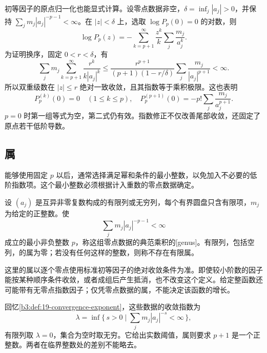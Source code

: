 \ProseParagraphBreak

初等因子的原点归一化也能显式计算。设零点数据非空，\(\delta=\inf_j|a_j|>0\)，并保持 \(\sum_jm_j|a_j|^{-p-1}<\infty\)。在 \(|z|<\delta\) 上，选取 \(\log P_p(0)=0\) 的对数，则
\begin{equation}\label{b3:eq:20-canonical-log-expansion}
 \log P_p(z)
 =-\sum_{k=p+1}^{\infty}\frac{z^k}{k}
       \sum_j\frac{m_j}{a_j^k}.
\end{equation}
为证明换序，固定 \(0<r<\delta\)，有
\[
 \sum_jm_j\sum_{k=p+1}^{\infty}\frac{r^k}{k|a_j|^k}
 \le\frac{r^{p+1}}{(p+1)(1-r/\delta)}
       \sum_j\frac{m_j}{|a_j|^{p+1}}<\infty.
\]
所以双重级数在 \(|z|\le r\) 绝对一致收敛，且其指数等于乘积极限。这也表明
\[
 P_p^{(k)}(0)=0\quad(1\le k\le p),\quad
 P_p^{(p+1)}(0)=-p!\sum_j\frac{m_j}{a_j^{p+1}}.
\]
\(p=0\) 时第一组等式为空，第二式仍有效。指数修正不仅改善尾部收敛，还固定了原点若干低阶导数。

\subsection{属}
\label{b3:subsec:200203}

能够使用固定 \(p\) 以后，通常选择满足幂和条件的最小整数，以免加入不必要的低阶指数项。这个最小整数必须根据计入重数的零点数据确定。

\begin{definition}\label{b3:def:20-product-genus}
设 \((a_j)\) 是互异非零复数构成的有限列或无穷列，每个有界圆盘只含有限项，\(m_j\) 为给定的正整数。使
\[
 \sum_jm_j|a_j|^{-p-1}<\infty
\]
成立的最小非负整数 \(p\)，称这组零点数据的典范乘积的[genus]。有限列，包括空列，的属为零；若没有任何这样的整数，则称不存在有限属。
\end{definition}
这里的属以逐个零点使用标准初等因子的绝对收敛条件为准。即使较小阶数的因子能按某种顺序条件收敛，或者成组后产生抵消，也不改变这个定义。给定整函数还可能带有无零点指数因子；仅凭零点数据的属，不能决定该函数的增长。

\ProseParagraphBreak

回忆\cref{b3:def:19-convergence-exponent}，这些数据的收敛指数为
\[
 \lambda=\inf\bigl\{\,s>0\mid
                  \sum_jm_j|a_j|^{-s}<\infty\,\bigr\},
\]
有限列取 \(\lambda=0\)，集合为空时取无穷。它给出实数阈值，属则要求 \(p+1\) 是一个正整数。两者在临界整数处的差别不能略去。

